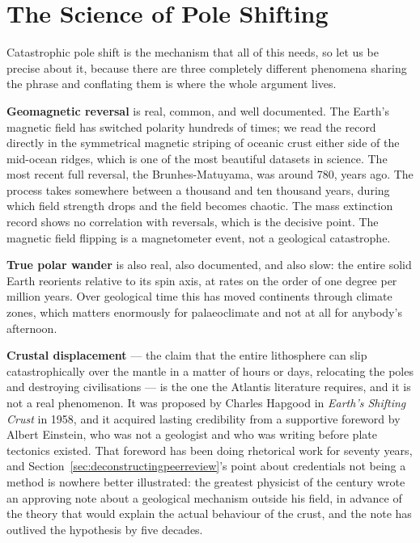 \section{The Science of Pole Shifting}\label{sec:sciencepoleshifting}

Catastrophic pole shift is the mechanism that all of this needs, so let us be precise about it,
because there are three completely different phenomena sharing the phrase and conflating them is
where the whole argument lives.

\textbf{Geomagnetic reversal} is real, common, and well documented. The Earth's magnetic field has
switched polarity hundreds of times; we read the record directly in the symmetrical magnetic striping
of oceanic crust either side of the mid-ocean ridges, which is one of the most beautiful datasets in
science. The most recent full reversal, the Brunhes-Matuyama, was around 780, years ago. The
process takes somewhere between a thousand and ten thousand years, during which field strength drops
and the field becomes chaotic. The mass extinction record shows no correlation with reversals, which
is the decisive point. The magnetic field flipping is a magnetometer event, not a geological
catastrophe.

\textbf{True polar wander} is also real, also documented, and also slow: the entire solid Earth
reorients relative to its spin axis, at rates on the order of one degree per million years. Over
geological time this has moved continents through climate zones, which matters enormously for
palaeoclimate and not at all for anybody's afternoon.

\textbf{Crustal displacement} --- the claim that the entire lithosphere can slip catastrophically over
the mantle in a matter of hours or days, relocating the poles and destroying civilisations --- is the
one the Atlantis literature requires, and it is not a real phenomenon. It was proposed by Charles
Hapgood in \emph{Earth's Shifting Crust} in 1958, and it acquired lasting credibility from a
supportive foreword by Albert Einstein, who was not a geologist and who was writing before plate
tectonics existed. That foreword has been doing rhetorical work for seventy years, and
Section~\ref{sec:deconstructingpeerreview}'s point about credentials not being a method is nowhere better illustrated: the greatest
physicist of the century wrote an approving note about a geological mechanism outside his field, in
advance of the theory that would explain the actual behaviour of the crust, and the note has outlived
the hypothesis by five decades.

